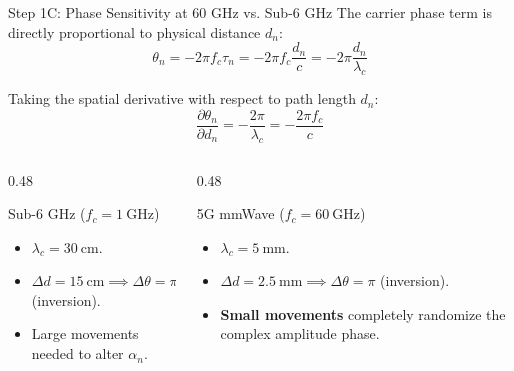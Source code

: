 \documentclass[10pt,aspectratio=169]{beamer}
\begin{document}
\begin{frame}{Step 1C: Phase Sensitivity at 60 GHz vs. Sub-6 GHz}
  The carrier phase term is directly proportional to physical distance $d_n$:
  \begin{equation}
    \theta_n = -2\pi f_c \tau_n = -2\pi f_c \frac{d_n}{c} = -2\pi \frac{d_n}{\lambda_c}
  \end{equation}

  Taking the spatial derivative with respect to path length $d_n$:
  \begin{equation}
    \boxed{\frac{\partial \theta_n}{\partial d_n} = -\frac{2\pi}{\lambda_c} = -\frac{2\pi f_c}{c}}
  \end{equation}

  \begin{columns}[T]
    \begin{column}{0.48\textwidth}
      \begin{exampleblock}{Sub-6 GHz ($f_c = \SI{1}{\giga\hertz}$)}
        \begin{itemize}
          \item $\lambda_c = \SI{30}{\centi\meter}$.
          \item $\Delta d = \SI{15}{\centi\meter} \implies \Delta\theta = \pi$ (inversion).
          \item Large movements needed to alter $\alpha_n$.
        \end{itemize}
      \end{exampleblock}
    \end{column}

    \begin{column}{0.48\textwidth}
      \begin{alertblock}{5G mmWave ($f_c = \SI{60}{\giga\hertz}$)}
        \begin{itemize}
          \item $\lambda_c = \SI{5}{\milli\meter}$.
          \item $\Delta d = \SI{2.5}{\milli\meter} \implies \Delta\theta = \pi$ (inversion).
          \item \textbf{Small movements} completely randomize the complex amplitude phase.
        \end{itemize}
      \end{alertblock}
    \end{column}
  \end{columns}
\end{frame}
\end{document}
